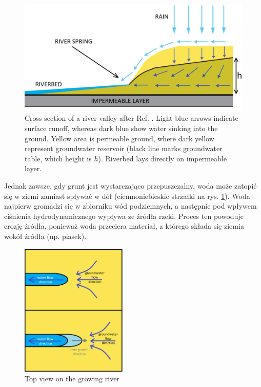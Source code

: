 \documentclass[]{pracamgr}
\begin{document}
    \begin{figure}[H]
      \centering
      \includegraphics[width=1\textwidth]{figs/pow_wsiakanie_eng.png}
      \caption { Cross section of a river valley after Ref. \cite{berhanu2012shape}. Light blue arrows indicate surface runoff, whereas dark blue show water sinking into the ground. Yellow area is permeable ground, where dark yellow represent groundwater reservoir (black line marks groundwater table, which height is $h$). Riverbed lays directly on impermeable layer.}
      \label{pow_wsiakanie}
    \end{figure}

    Jednak zawsze, gdy grunt jest wystarczająco przepuszczalny, woda może zatopić się w ziemi zamiast spływać w dół (ciemnoniebieskie strzałki na rys. \ref{pow_wsiakanie}). Woda najpierw gromadzi się w zbiorniku wód podziemnych, a następnie pod wpływem ciśnienia hydrodynamicznego wypływa ze źródła rzeki. Proces ten powoduje erozję źródła, ponieważ woda przeciera materiał, z którego składa się ziemia wokół źródła (np. piasek).

    \begin{figure}
      \begin{center}
        \vspace{-20pt}
        \includegraphics[width=0.45\textwidth]{figs/zrodlo_eng.png}
      \end{center}
      \vspace{-20pt}
      \caption{Top view on the growing river}
      \vspace{0pt}
      \label{zrodlo}
    \end{figure}
\end{document}
